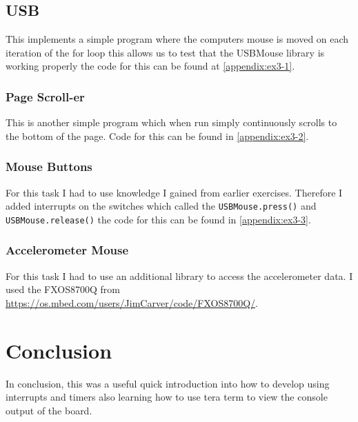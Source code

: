 \documentclass[a4paper,12pt]{scrartcl}
\begin{document}
{		\subsection{USB}
		{
			This implements a simple program where the computers mouse is moved on each iteration of the for loop this allows us to test that the USBMouse library is working properly the code for this can be found at \cref{appendix:ex3-1}.
			\subsubsection{Page Scroll-er}
			{
				This is another simple program which when run simply continuously scrolls to the bottom of the page. Code for this can be found in \cref{appendix:ex3-2}.
			}
			\subsubsection{Mouse Buttons}
			{
				For this task I had to use knowledge I gained from earlier exercises. Therefore I added interrupts on the switches which called the \lstinline|USBMouse.press()| and \lstinline|USBMouse.release()| the code for this can be found in \cref{appendix:ex3-3}.
			}
			\subsubsection{Accelerometer Mouse}
			{
				For this task I had to use an additional library to access the accelerometer data. I used the FXOS8700Q from \url{https://os.mbed.com/users/JimCarver/code/FXOS8700Q/}.
			}
		}
	}

	\section{Conclusion}
	{
		In conclusion, this was a useful quick introduction into how to develop using interrupts and timers also learning how to use tera term to view the console output of the board.
	}
	
	\newpage
	
	\printbibliography[heading=bibintoc,title=References]
\end{document}
